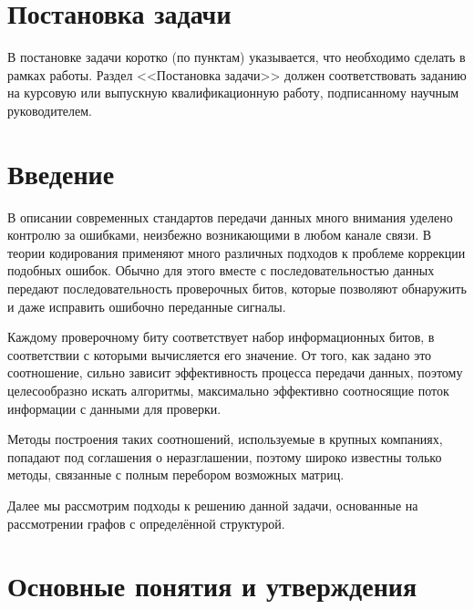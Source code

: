 \documentclass[14pt]{mmcs_article}
\begin{document}


\renewcommand{\contentsname}{Оглавление}

\tableofcontents

\newpage
{}

\section*{Постановка задачи}


В постановке задачи коротко (по пунктам) указывается, что необходимо сделать в рамках работы. Раздел <<Постановка задачи>> должен соответствовать заданию на курсовую или выпускную квалификационную работу, подписанному научным руководителем.


\newpage
{}
\section*{Введение}

В описании современных стандартов передачи данных много внимания уделено контролю за ошибками, неизбежно возникающими в любом канале связи. В теории кодирования применяют много различных подходов к проблеме коррекции подобных ошибок. Обычно для этого вместе с последовательностью данных передают последовательность проверочных битов, которые позволяют обнаружить и даже исправить ошибочно переданные сигналы.

Каждому проверочному биту соответствует набор информационных битов, в соответствии с которыми вычисляется его значение. От того, как задано это соотношение, сильно зависит эффективность процесса передачи данных, поэтому целесообразно искать алгоритмы, максимально эффективно соотносящие поток информации с данными для проверки.

Методы построения таких соотношений, используемые в крупных компаниях, попадают под соглашения о неразглашении, поэтому широко известны только методы, связанные с полным перебором возможных матриц.

Далее мы рассмотрим подходы к решению данной задачи, основанные на рассмотрении графов с определённой структурой.

\newpage
\section{Основные понятия и утверждения}\label{dsfs}
\end{document}
